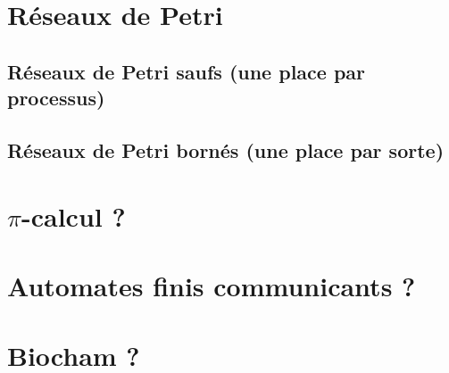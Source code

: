 





\section{Réseaux de Petri}
  \subsection{Réseaux de Petri saufs (une place par processus)}
  \subsection{Réseaux de Petri bornés (une place par sorte)}

\section{$\pi$-calcul ?}

\section{Automates finis communicants ?}

\section{Biocham ?}

